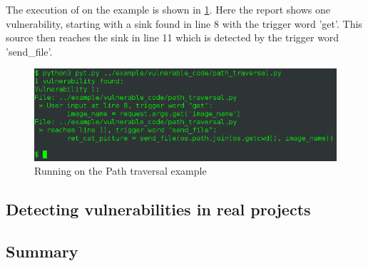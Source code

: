 The execution of \pyt{} on the example is shown in \cref{path_traversal:console}.
Here the report shows one vulnerability, starting with a sink found in line 8 with the trigger word 'get'.
This source then reaches the sink in line 11 which is detected by the trigger word 'send\_file'.

\begin{figure}
  \includegraphics[width=\textwidth]{./figures/path_traversal_console.png}
  \caption{Running \pyt{} on the Path traversal example}
  \label{path_traversal:console}
\end{figure}

\subsection{Detecting vulnerabilities in real projects}\label{evaluation:real}

\subsection{Summary}
